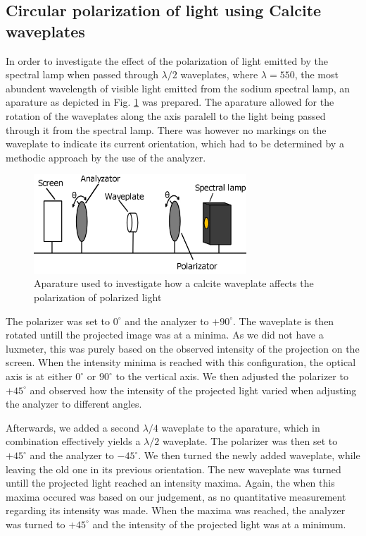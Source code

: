 \documentclass[11pt,a4paper, twocolumn]{article}
\begin{document}
  \subsection{Circular polarization of light using Calcite waveplates}
    In order to investigate the effect of the polarization of light emitted by the spectral lamp when passed through $\lambda /2$ waveplates, where $\lambda=550$, the most abundent wavelength of visible light emitted from the sodium spectral lamp, an aparature as depicted in Fig. \ref{fig:waveplate} was prepared. The aparature allowed for the rotation of the waveplates along the axis paralell to the light being passed through it from the spectral lamp. There was however no markings on the waveplate to indicate its current orientation, which had to be determined by a methodic approach by the use of the analyzer.

    \begin{figure}[H]
      \center
      \includegraphics[width=8cm]{scripts/figs/diagram_6.png}
      \caption{Aparature used to investigate how a calcite waveplate affects the polarization of polarized light}
      \label{fig:waveplate}
    \end{figure}

    The polarizer was set to $0^\circ$ and the analyzer to $+90^\circ$. The waveplate is then rotated untill the projected image was at a minima. As we did not have a luxmeter, this was purely based on the observed intensity of the projection on the screen. When the intensity minima is reached with this configuration, the optical axis is at either $0^\circ$ or $90^\circ$ to the vertical axis. We then adjusted the polarizer to $+45^\circ$ and observed how the intensity of the projected light varied when adjusting the analyzer to different angles.

    Afterwards, we added a second $\lambda/4$ waveplate to the aparature, which in combination effectively yields a $\lambda/2$ waveplate. The polarizer was then set to $+45^\circ$ and the analyzer to $-45^\circ$. We then turned the newly added waveplate, while leaving the old one in its previous orientation. The new waveplate was turned untill the projected light reached an intensity maxima. Again, the when this maxima occured was based on our judgement, as no quantitative measurement regarding its intensity was made. When the maxima was reached, the analyzer was turned to $+45^\circ$ and the intensity of the projected light was at a minimum.
    
\end{document}
